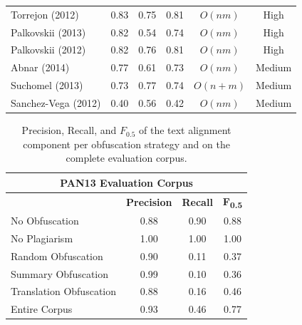 \documentclass[fleqn,10pt]{wlscirep}
\begin{document}
\begin{table}[ht]
\begin{tabular}{@{}l*{3}{c}cc@{}}
      Torrejon (2012)   &       0.83            &    0.75       &  0.81             & $O(nm)$       & High              \\ %
    Palkovskii (2013)   &       0.82            &    0.54       &  0.74             & $O(nm)$       & High              \\
    Palkovskii (2012)   &       0.82            &    0.76       &  0.81             & $O(nm)$       & High              \\
         Abnar (2014)   &       0.77            &    0.61       &  0.73             & $O(nm)$       & Medium            \\
      Suchomel (2013)   &       0.73            &    0.77       &  0.74             & $O(n+m)$      & Medium            \\
  Sanchez-Vega (2012)   &       0.40            &    0.56       &  0.42             & $O(nm)$       & Medium            \\
\bottomrule
\end{tabular}
\end{table}

\begin{table}[ht]
\centering
\caption{Precision, Recall, and $F_{0.5}$ of the text alignment component per obfuscation strategy and on the complete evaluation corpus.}
\label{tab:evaluation}
\begin{tabular}{lccc}
\multicolumn{4}{c}{\textsf{\textbf{PAN13 Evaluation Corpus}}} \\[1.1ex]
\toprule
                        &  \textsf{\textbf{Precision}} &  \textsf{\textbf{Recall}} &\textsf{\textbf{F\textsubscript{0.5}}} \\
\midrule
No Obfuscation          &       0.88 &    0.90 &  0.88 \\
No Plagiarism           &       1.00 &    1.00 &  1.00 \\
Random Obfuscation      &       0.90 &    0.11 &  0.37 \\
Summary Obfuscation     &       0.99 &    0.10 &  0.36 \\
Translation Obfuscation &       0.88 &    0.16 &  0.46 \\ \midrule
Entire Corpus           &       0.93 &    0.46 &  0.77 \\
\bottomrule
\end{tabular}
\end{table}
\end{document}
